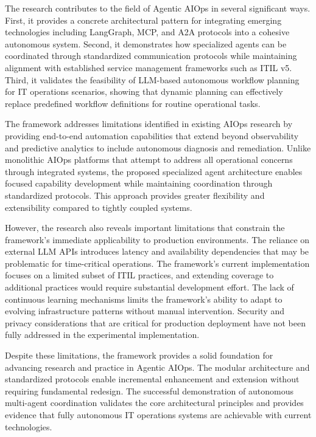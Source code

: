 \documentclass{article}
\begin{document}
The research contributes to the field of Agentic AIOps in several significant ways. First, it provides a concrete architectural pattern for integrating emerging technologies including LangGraph, MCP, and A2A protocols into a cohesive autonomous system. Second, it demonstrates how specialized agents can be coordinated through standardized communication protocols while maintaining alignment with established service management frameworks such as ITIL v5. Third, it validates the feasibility of LLM-based autonomous workflow planning for IT operations scenarios, showing that dynamic planning can effectively replace predefined workflow definitions for routine operational tasks.

The framework addresses limitations identified in existing AIOps research by providing end-to-end automation capabilities that extend beyond observability and predictive analytics to include autonomous diagnosis and remediation. Unlike monolithic AIOps platforms that attempt to address all operational concerns through integrated systems, the proposed specialized agent architecture enables focused capability development while maintaining coordination through standardized protocols. This approach provides greater flexibility and extensibility compared to tightly coupled systems.

However, the research also reveals important limitations that constrain the framework's immediate applicability to production environments. The reliance on external LLM APIs introduces latency and availability dependencies that may be problematic for time-critical operations. The framework's current implementation focuses on a limited subset of ITIL practices, and extending coverage to additional practices would require substantial development effort. The lack of continuous learning mechanisms limits the framework's ability to adapt to evolving infrastructure patterns without manual intervention. Security and privacy considerations that are critical for production deployment have not been fully addressed in the experimental implementation.

Despite these limitations, the framework provides a solid foundation for advancing research and practice in Agentic AIOps. The modular architecture and standardized protocols enable incremental enhancement and extension without requiring fundamental redesign. The successful demonstration of autonomous multi-agent coordination validates the core architectural principles and provides evidence that fully autonomous IT operations systems are achievable with current technologies.
\end{document}
